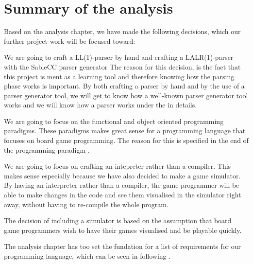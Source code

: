 \section{Summary of the analysis}
\label{sec:summaryofdecisions}

Based on the analysis chapter, we have made the following decisions, which our further project work will be focused toward:

We are going to craft a LL(1)-parser by hand and crafting a LALR(1)-parser with the SableCC parser generator
The reason for this decision, is the fact that this project is ment as a learning tool and therefore knowing how the parsing
phase works is important. By both crafting a parser by hand and by the use of a parser generator tool, we will get to know
how a well-known parser generator tool works and we will know how a parser works under the in details.

We are going to focus on the functional and object oriented programming paradigms. These paradigms makes great sense for a programming
language that focuses on board game programming. The reason for this is specified in the end of the programming paradigm .

We are going to focus on crafting an intepreter rather than a compiler. This makes sense especially because we have also decided to make a game simulator.
By having an interpreter rather than a compiler, the game programmer will be able to make changes in the code and see them visualised in the simulator right away, without having to re-compile the whole program.

The decision of including a simulator is based on the assumption that board game programmers wish to have their games visualised and be playable quickly.

The analysis chapter has too set the fundation for a list of requirements for our programming language, which can be seen in following .    